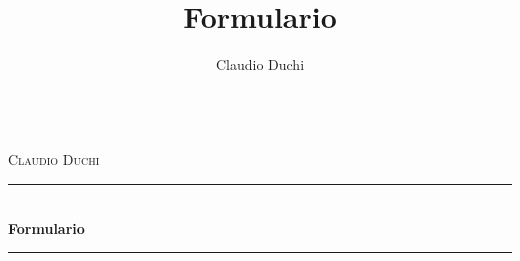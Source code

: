 \documentclass[openany]{book}%
\title{Formulario}
\author{Claudio Duchi}
\date{\datetime}
\makeatletter
\newcommand{\HRule}{\rule{\linewidth}{0.5mm}}
\renewcommand\frontmatter{%
	\cleardoublepage
	\@mainmatterfalse
}
\renewcommand\mainmatter{%
	\cleardoublepage
	\@mainmattertrue
}
\makeatother
\begin{document}
		\frontmatter
		\hypersetup{pageanchor=false}
		\begin{titlepage}
			\begin{center}
			\\[1cm]
				\textsc{\LARGE Claudio Duchi}\\[1.5cm]
				\HRule \\[0.4cm]
				{ \huge \bfseries Formulario}\\[0.4cm]
				\HRule \\[1.5cm]
				\vfill
			\end{center}
		\end{titlepage}
	\hypersetup{pageanchor=true}
		
		\tableofcontents
		\listoffigures
			\listoftables
			\mainmatter
			

\printindex
\end{document}
